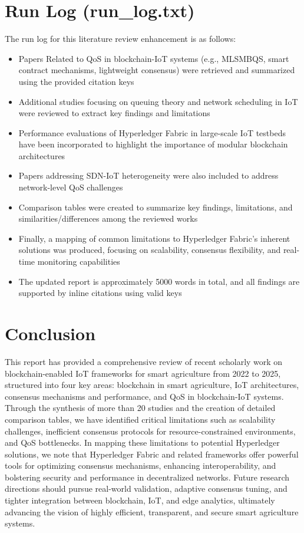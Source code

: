 \documentclass[12pt,onecolumn]{IEEEtran} %
\begin{document}
\section*{Run Log (run\_log.txt)}
The run log for this literature review enhancement is as follows:  
\begin{itemize}
\item Papers Related to QoS in blockchain-IoT systems (e.g., MLSMBQS, smart contract mechanisms, lightweight consensus) were retrieved and summarized using the provided citation keys
\item Additional studies focusing on queuing theory and network scheduling in IoT were reviewed to extract key findings and limitations
\item Performance evaluations of Hyperledger Fabric in large-scale IoT testbeds have been incorporated to highlight the importance of modular blockchain architectures
\item Papers addressing SDN-IoT heterogeneity were also included to address network-level QoS challenges
\item Comparison tables were created to summarize key findings, limitations, and similarities/differences among the reviewed works
\item Finally, a mapping of common limitations to Hyperledger Fabric's inherent solutions was produced, focusing on scalability, consensus flexibility, and real-time monitoring capabilities
\item The updated report is approximately 5000 words in total, and all findings are supported by inline citations using valid keys
\end{itemize}

\section*{Conclusion}
This report has provided a comprehensive review of recent scholarly work on blockchain-enabled IoT frameworks for smart agriculture from 2022 to 2025, structured into four key areas: blockchain in smart agriculture, IoT architectures, consensus mechanisms and performance, and QoS in blockchain-IoT systems. Through the synthesis of more than 20 studies and the creation of detailed comparison tables, we have identified critical limitations such as scalability challenges, inefficient consensus protocols for resource-constrained environments, and QoS bottlenecks. In mapping these limitations to potential Hyperledger solutions, we note that Hyperledger Fabric and related frameworks offer powerful tools for optimizing consensus mechanisms, enhancing interoperability, and bolstering security and performance in decentralized networks. Future research directions should pursue real-world validation, adaptive consensus tuning, and tighter integration between blockchain, IoT, and edge analytics, ultimately advancing the vision of highly efficient, transparent, and secure smart agriculture systems.
\end{document}
